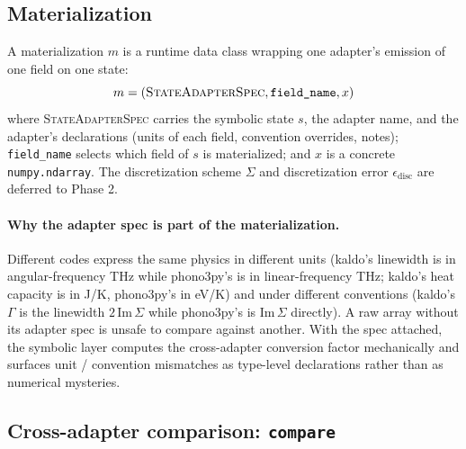 \documentclass[11pt,a4paper]{article}
\begin{document}
\subsection{Materialization}

A materialization $m$ is a runtime data class wrapping one adapter's emission of one
field on one state:
\begin{equation*}
  m = (\textsc{StateAdapterSpec}, \texttt{field\_name}, x)
\end{equation*}
where \textsc{StateAdapterSpec} carries the symbolic state $s$, the adapter name, and
the adapter's declarations (units of each field, convention overrides, notes);
\texttt{field\_name} selects which field of $s$ is materialized; and $x$ is a concrete
\texttt{numpy.ndarray}. The discretization scheme $\Sigma$ and discretization error
$\epsilon_{\text{disc}}$ are deferred to Phase 2.

\paragraph{Why the adapter spec is part of the materialization.} Different codes
express the same physics in different units (kaldo's linewidth is in angular-frequency
THz while phono3py's is in linear-frequency THz; kaldo's heat capacity is in J/K,
phono3py's in eV/K) and under different conventions (kaldo's $\Gamma$ is the linewidth
$2\,\text{Im}\,\Sigma$ while phono3py's is $\text{Im}\,\Sigma$ directly). A raw array
without its adapter spec is unsafe to compare against another. With the spec attached,
the symbolic layer computes the cross-adapter conversion factor mechanically and surfaces
unit / convention mismatches as type-level declarations rather than as numerical
mysteries.

\subsection{Cross-adapter comparison: \texttt{compare}}
\end{document}
